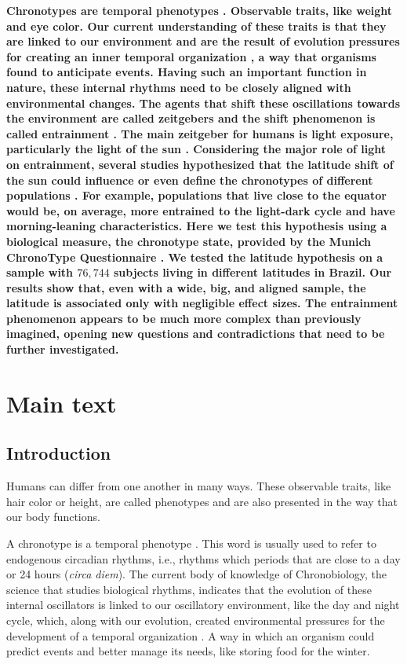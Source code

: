 \documentclass[
12pt,
openright,
oneside,
a4paper,
chapter=TITLE,
section=TITLE,
french,
spanish,
brazil,
english
]{abntex2}\usepackage{array}
\begin{document}
\noindent \textbf{Chronotypes are temporal phenotypes
\autocite{ehret1974,pittendrigh1993}. Observable traits, like weight and
eye color. Our current understanding of these traits is that they are
linked to our environment and are the result of evolution pressures for
creating an inner temporal organization
\autocite{aschoff1989,paranjpe2005}, a way that organisms found to
anticipate events. Having such an important function in nature, these
internal rhythms need to be closely aligned with environmental changes.
The agents that shift these oscillations towards the environment are
called zeitgebers and the shift phenomenon is called entrainment
\autocite{roenneberg2003a,roenneberg2010}. The main zeitgeber for humans
is light exposure, particularly the light of the sun
\autocite{khalsa2003,minors1991,roenneberg2007a}. Considering the major
role of light on entrainment, several studies hypothesized that the
latitude shift of the sun could influence or even define the chronotypes
of different populations
\autocite{horzum2015,hut2013,leocadio-miguel2017,leocadio-miguel2014,pittendrigh1991,randler2017}.
For example, populations that live close to the equator would be, on
average, more entrained to the light-dark cycle and have morning-leaning
characteristics. Here we test this hypothesis using a biological
measure, the chronotype state, provided by the Munich ChronoType
Questionnaire \autocite{roenneberg2003}. We tested the latitude
hypothesis on a sample with \(76,744\) subjects living in different
latitudes in Brazil. Our results show that, even with a wide, big, and
aligned sample, the latitude is associated only with negligible effect
sizes. The entrainment phenomenon appears to be much more complex than
previously imagined, opening new questions and contradictions that need
to be further investigated.}

\section{Main text}\label{main-text}

\subsection{Introduction}\label{introduction-1}

Humans can differ from one another in many ways. These observable
traits, like hair color or height, are called phenotypes and are also
presented in the way that our body functions.

A chronotype is a temporal phenotype
\autocite{ehret1974,pittendrigh1993}. This word is usually used to refer
to endogenous circadian rhythms, i.e., rhythms which periods that are
close to a day or 24 hours (\emph{circa diem}). The current body of
knowledge of Chronobiology, the science that studies biological rhythms,
indicates that the evolution of these internal oscillators is linked to
our oscillatory environment, like the day and night cycle, which, along
with our evolution, created environmental pressures for the development
of a temporal organization \autocite{aschoff1989,paranjpe2005}. A way in
which an organism could predict events and better manage its needs, like
storing food for the winter.
\end{document}
